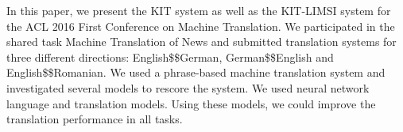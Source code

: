 In this paper, we present the KIT system as well as the KIT-LIMSI system for the ACL 2016 First Conference on Machine Translation. We participated in the shared task Machine Translation of News and submitted translation systems for three different directions: English\$\rightarrow\$German, German\$\rightarrow\$English and English\$\rightarrow\$Romanian. We used a phrase-based machine translation system and investigated several models to rescore the system. We used neural network language and translation models. Using these models, we could improve the translation performance in all tasks.
